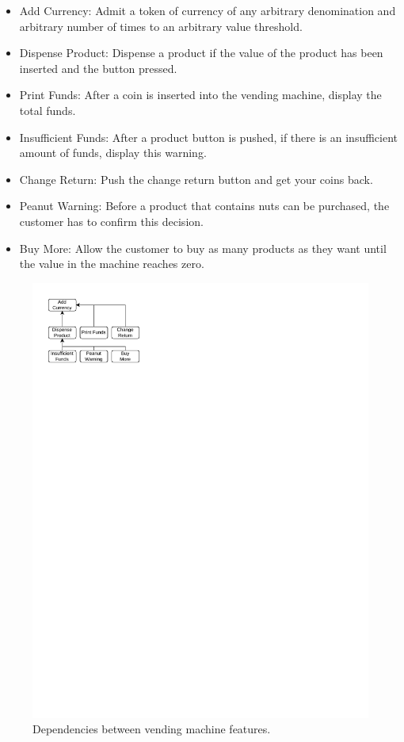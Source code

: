 \documentclass[sigplan,anonymous,review]{acmart}
\begin{document}
\begin{itemize}
    \item Add Currency: Admit a token of currency of any arbitrary denomination and arbitrary number of times to an arbitrary value threshold.
    \item Dispense Product: Dispense a product if the value of the product has been inserted and the button pressed.
    \item Print Funds: After a coin is inserted into the vending machine, display the total funds.
    \item Insufficient Funds: After a product button is pushed, if there is an insufficient amount of funds, display this warning.
    \item Change Return: Push the change return button and get your coins back.
    \item Peanut Warning: Before a product that contains nuts can be purchased, the customer has to confirm this decision.
    \item Buy More: Allow the customer to buy as many products as they want until the value in the machine reaches zero.
\end{itemize}

\begin{figure}[htbp]
    \centering
    \includegraphics{figures/VendingMachine.pdf}
    \caption{Dependencies between vending machine features.}
    \label{fig:vmDependencies}
\end{figure}
\end{document}
